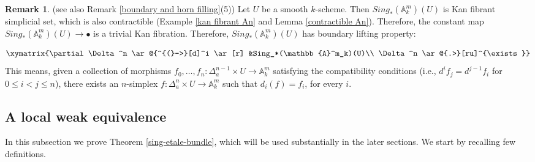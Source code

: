 \documentclass[11pt, reqno]{amsart}
\theoremstyle{plain}
\theoremstyle{definition}
\newtheorem{remark}[thm]{Remark}
\newcommand{\A}{{\mathbb A}}
\begin{document}
\begin{remark} (see also Remark \ref{boundary and horn filling}(5)) \label{boundary lifting question}
     Let $U$ be a smooth $k$-scheme. Then $Sing_*(\mathbb{A}^m_k)(U)$ is Kan fibrant simplicial set, which is also contractible (Example \ref{kan fibrant An} and Lemma \ref{contractible An}). Therefore, the constant map $Sing_*(\mathbb{A}^m_k)(U) \to \bullet$ is a trivial Kan fibration. Therefore, $Sing_*(\mathbb{A}^m_k)(U)$ has boundary lifting property:
    
		\[\xymatrix{\partial \Delta^n \ar@{^{(}->}[d]^i \ar[r] &Sing_*(\mathbb{A}^m_k)(U)\\
		\Delta^n \ar@{.>}[ru]^{\exists}} \]
        This means, given a collection of morphisms $f_0, \dots, f_n: \Delta^{n-1}_a \times U \to \mathbb{A}^m_k$ satisfying the compatibility conditions (i.e., $d^if_j = d^{j-1}f_i$ for $0 \leq i<j \leq n$), there exists an $n$-simplex $f: \Delta^n_a \times U \to \mathbb{A}^m_k$ such that $d_i(f) = f_i$, for every $i$. 
        
\end{remark}


\subsection{A local weak equivalence}
	In this subsection we prove Theorem \ref{sing-etale-bundle},
which will be used substantially in the later sections. We start by recalling few definitions.  
\end{document}
